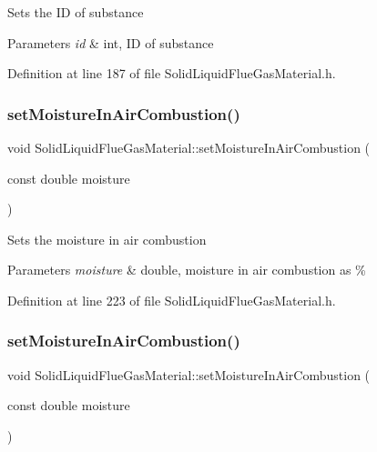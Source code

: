 Sets the ID of substance 
\begin{DoxyParams}{Parameters}
{\em id} & int, ID of substance \\
\hline
\end{DoxyParams}


Definition at line 187 of file Solid\+Liquid\+Flue\+Gas\+Material.\+h.

\mbox{\label{class_solid_liquid_flue_gas_material_a1a5f1bd3008e78cce62edb8aca642284}} 
\subsubsection{\texorpdfstring{set\+Moisture\+In\+Air\+Combustion()}{setMoistureInAirCombustion()}\hspace{0.1cm}{\footnotesize\ttfamily [1/3]}}
{\footnotesize\ttfamily void Solid\+Liquid\+Flue\+Gas\+Material\+::set\+Moisture\+In\+Air\+Combustion (\begin{DoxyParamCaption}\item[{const double}]{moisture }\end{DoxyParamCaption})\hspace{0.3cm}{\ttfamily [inline]}}

Sets the moisture in air combustion 
\begin{DoxyParams}{Parameters}
{\em moisture} & double, moisture in air combustion as \% \\
\hline
\end{DoxyParams}


Definition at line 223 of file Solid\+Liquid\+Flue\+Gas\+Material.\+h.

\mbox{\label{class_solid_liquid_flue_gas_material_a1a5f1bd3008e78cce62edb8aca642284}} 
\subsubsection{\texorpdfstring{set\+Moisture\+In\+Air\+Combustion()}{setMoistureInAirCombustion()}\hspace{0.1cm}{\footnotesize\ttfamily [2/3]}}
{\footnotesize\ttfamily void Solid\+Liquid\+Flue\+Gas\+Material\+::set\+Moisture\+In\+Air\+Combustion (\begin{DoxyParamCaption}\item[{const double}]{moisture }\end{DoxyParamCaption})\hspace{0.3cm}{\ttfamily [inline]}}

